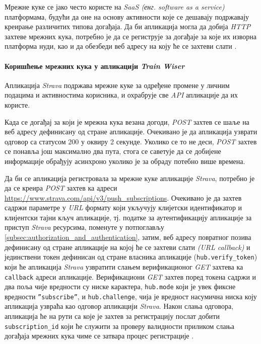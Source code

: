 \documentclass[12pt,oneside]{memoir}
\begin{document}
Мрежне куке се јако често користе на \textit{SaaS (енг. software as a service)} платформама, будући да оне на основу активности које се дешавају подржавају креирање различитих типова догађаја. Да би апликација могла да добија \textit{HTTP} захтеве мрежних кука, потребно је да се региструје за догађаје за које их изворна платформа нуди, као и да обезбеди веб адресу на коју ће се захтеви слати \cite{webhooks_hookdeck, strava_webhooks}.

\paragraph{Коришћење мрежних кука у апликацији \textit{Train Wiser}} Апликација \textit{Strava} подржава мрежне куке за одређене промене у личним подацима и активностима корисника, и охрабрује све \textit{API} апликације да их користе. 

Када се догађај за који је мрежна кука везана догоди, \textit{POST} захтев се шаље на веб адресу дефинисану од стране апликације. Очекивано је да апликација узврати одговор са статусом 200 у оквиру 2 секунде. Уколико се то не деси, \textit{POST} захтев се понавља још максимално два пута, стога се саветује да се добијене информације обрађују асинхроно уколико је за обраду потебно више времена.

Да би се апликација регистровала за мрежне куке апликације \textit{Strava}, потребно је да се креира \textit{POST} захтев ка адреси
\url{https://www.strava.com/api/v3/push_subscriptions}. Очекивано је да захтев садржи параметре у \textit{URL} формату који укључују клијетски идентификатор и клијентски тајни кључ апликације, тј. податке за аутентификацију апликације за приступ \textit{Strava} ресурсима, поменуте у потпоглављу \ref{subsec:authorization_and_authentication}, затим, веб адресу повратног позива дефинисану од стране апликације на којој ће се захтеви слати \textit{(URL callback)} и јединствени токен дефинисан од стране власника апликације (\texttt{hub.verify\_token}) који ће апликација \textit{Strava} узвратити слањем верификационог \textit{GET} захтева ка \texttt{callback} адреси апликације. Верификациони \textit{GET} захтев поред токена садржи и два поља чије вредности су ниске карактера, \texttt{hub.mode} који је увек фиксне вредности \texttt{''subscribe''}, и \texttt{hub.challenge}, чија је вредност насумична ниска коју апликација узвраћа као одговор апликацији \textit{Strava}. Након слања одговора, апликација ће на рути са које је захтев за регистрацију послат добити \texttt{subscription\_id} који ће служити за проверу валидности приликом слања догађаја мрежних кука чиме се затвара процес регистрације \cite{strava_webhooks}.
\end{document}
